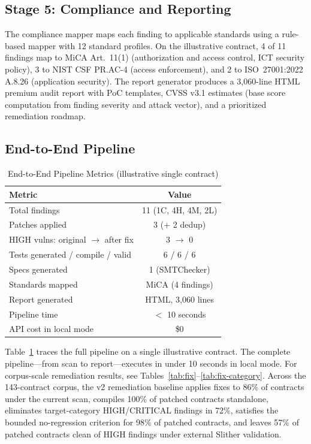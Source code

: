 \documentclass[conference]{IEEEtran}
\begin{document}
\subsection{Stage 5: Compliance and Reporting}

The compliance mapper maps each finding to applicable standards using a rule-based mapper with 12 standard profiles. On the illustrative contract, 4 of 11 findings map to MiCA Art.~11(1) (authorization and access control, ICT security policy), 3 to NIST CSF PR.AC-4 (access enforcement), and 2 to ISO~27001:2022 A.8.26 (application security). The report generator produces a 3{,}060-line HTML premium audit report with PoC templates, CVSS v3.1 estimates (base score computation from finding severity and attack vector), and a prioritized remediation roadmap.

\subsection{End-to-End Pipeline}

\begin{table}[htbp]
\caption{End-to-End Pipeline Metrics (illustrative single contract)}
\label{tab:e2e}
\centering
\begin{tabular}{@{}lc@{}}
\toprule
\textbf{Metric} & \textbf{Value} \\
\midrule
Total findings & 11 (1C, 4H, 4M, 2L) \\
Patches applied & 3 (+ 2 dedup) \\
HIGH vulns: original $\rightarrow$ after fix & 3 $\rightarrow$ 0 \\
Tests generated / compile / valid & 6 / 6 / 6 \\
Specs generated & 1 (SMTChecker) \\
Standards mapped & MiCA (4 findings) \\
Report generated & HTML, 3{,}060 lines \\
Pipeline time & $<$ 10 seconds \\
API cost in local mode & \$0 \\
\bottomrule
\end{tabular}
\end{table}

Table~\ref{tab:e2e} traces the full pipeline on a single illustrative contract. The complete pipeline---from scan to report---executes in under 10 seconds in local mode. For corpus-scale remediation results, see Tables~\ref{tab:fix}--\ref{tab:fix-category}. Across the 143-contract corpus, the v2 remediation baseline applies fixes to 86\% of contracts under the current scan, compiles 100\% of patched contracts standalone, eliminates target-category HIGH/CRITICAL findings in 72\%, satisfies the bounded no-regression criterion for 98\% of patched contracts, and leaves 57\% of patched contracts clean of HIGH findings under external Slither validation.
\end{document}

